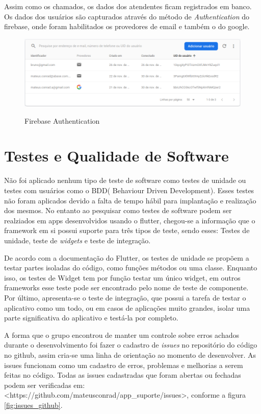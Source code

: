 Assim como os chamados, os dados dos atendentes ficam registrados em banco. Os dados dos usuários são capturados através do método de \textit{Authentication} do firebase, onde foram habilitados os provedores de email e também o do google.   
    
    \begin{figure}[htb]
        \caption{Firebase Authentication}
        \centering
        \begin{frame}{
        \includegraphics [scale = 0.455]{img/firestore2.png}}
        \end{frame}
        \label{fig:firestore2}
    \end{figure}


\section{Testes e Qualidade de Software}
Não foi aplicado nenhum tipo de teste de software como testes de unidade ou testes com usuários como o BDD( Behaviour Driven Development). Esses testes não foram aplicados devido a falta de tempo hábil para implantação e realização dos mesmos. No entanto ao pesquisar como testes de software podem ser realziados em apps desenvolvidos usando o flutter, chegou-se a informação que o framework em si possui suporte para três tipos de teste, sendo esses: Testes de unidade, teste de \textit{widgets} e teste de integração.
 
De acordo com a documentação do Flutter, os testes de unidade se propõem a testar partes isoladas do código, como funções métodos ou uma classe. Enquanto isso, os testes de Widget tem por função testar um único widget, em outros frameworks esse teste pode ser encontrado pelo nome de teste de componente. Por último, apresenta-se o teste de integração, que possui a tarefa de testar o aplicativo como um todo, ou em casos de aplicações muito grandes, isolar uma parte significativa do aplicativo e testá-la por completo.

A forma que o grupo encontrou de manter um controle sobre erros achados durante o desenvolvimento foi fazer o cadastro de \textit{issues} no repositório do código no github, assim cria-se uma linha de orientação ao momento de desenvolver. As issues funcionam como um cadastro de erros, problemas e melhorias a serem feitas no código. Todas as issues cadastradas que foram abertas ou fechadas podem ser verificadas em: <https://github.com/mateusconrad/app\_suporte/issues>, conforme a figura \ref{fig:issues_github}.
    
